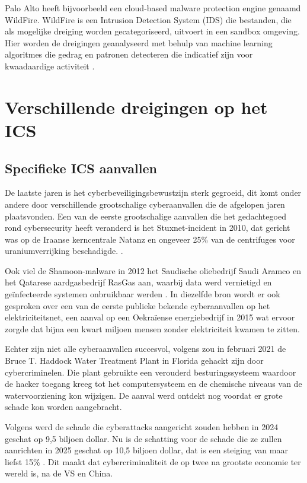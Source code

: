 Palo Alto heeft bijvoorbeeld een cloud-based malware protection engine genaamd WildFire. WildFire is een Intrusion Detection System (IDS) die bestanden, die als mogelijke dreiging worden gecategoriseerd, uitvoert in een sandbox omgeving. Hier worden de dreigingen geanalyseerd met behulp van machine learning algoritmes die gedrag en patronen detecteren die indicatief zijn voor kwaadaardige activiteit \autocite{PaloAltoWF2024}.




\section{Verschillende dreigingen op het ICS}

\subsection{Specifieke ICS aanvallen}

De laatste jaren is het cyberbeveiligingsbewustzijn sterk gegroeid, dit komt onder andere door verschillende grootschalige cyberaanvallen die de afgelopen jaren plaatsvonden. Een van de eerste grootschalige aanvallen die het gedachtegoed rond cybersecurity heeft veranderd is het Stuxnet-incident in 2010, dat gericht was op de Iraanse kerncentrale Natanz en ongeveer 25\% van de centrifuges voor uraniumverrijking beschadigde. \autocite{Zetter2014}. 

Ook viel de Shamoon-malware in 2012 het Saudische oliebedrijf Saudi Aramco en het Qatarese aardgasbedrijf RasGas aan, waarbij data werd vernietigd en geïnfecteerde systemen onbruikbaar werden \autocite{Hemsley2018}.
In diezelfde bron wordt er ook gesproken over een van de eerste publieke bekende cyberaanvallen op het elektriciteitsnet, een aanval op een Oekraïense energiebedrijf in 2015 wat ervoor zorgde dat bijna een kwart miljoen mensen zonder elektriciteit kwamen te zitten.

Echter zijn niet alle cyberaanvallen succesvol, volgens \textcite{Margolin2021} zou in februari 2021 de Bruce T. Haddock Water Treatment Plant in Florida gehackt zijn door cybercriminelen. Die plant gebruikte een verouderd besturingssysteem waardoor de hacker toegang kreeg tot het computersysteem en de chemische niveaus van de watervoorziening kon wijzigen. De aanval werd ontdekt nog voordat er grote schade kon worden aangebracht.



Volgens \textcite{Morgan2024} werd de schade die cyberattacks aangericht zouden hebben in 2024 geschat op 9,5 biljoen dollar. Nu is de schatting voor de schade die ze zullen aanrichten in 2025 geschat op 10,5 biljoen dollar, dat is een steiging van maar liefst 15\% . Dit maakt dat cybercriminaliteit de op twee na grootste economie ter wereld is, na de VS en China.

